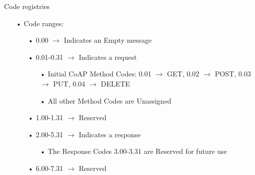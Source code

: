 \documentclass[11pt]{beamer}
\begin{document}
\begin{frame}{Code registries}
\begin{itemize}
\item[•] Code ranges:
\begin{itemize}
\item[•] 0.00 $\rightarrow$ Indicates an Empty message
\item[•] 0.01-0.31 $\rightarrow$ Indicates a request
\begin{itemize}
\item[•] Initial CoAP Method Codes: 0.01 $\rightarrow$ GET, 0.02 $\rightarrow$ POST, 0.03 $\rightarrow$ PUT, 0.04 $\rightarrow$ DELETE
\item[•] All other Method Codes are Unassigned
\end{itemize}
\item[•] 1.00-1.31 $\rightarrow$ Reserved
\item[•] 2.00-5.31 $\rightarrow$ Indicates a response
\begin{itemize}
\item[•] The Response Codes 3.00-3.31 are Reserved for future use
\end{itemize}
\item[•] 6.00-7.31 $\rightarrow$ Reserved
\end{itemize}
\end{itemize}
\end{frame}
\end{document}
